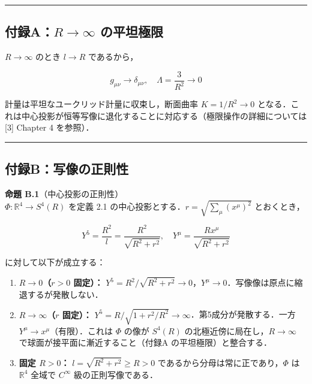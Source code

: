 \documentclass[a4paper,11pt]{ltjsarticle}
\theoremstyle{definition}
\begin{document}
\begin{center}\rule{0.5\linewidth}{0.5pt}\end{center}

\subsection{\texorpdfstring{付録A：\(R \to \infty\) の平坦極限}{付録A：R \textbackslash to \textbackslash infty の平坦極限}}\label{ux4ed8ux9332ar-to-infty-ux306eux5e73ux5766ux6975ux9650}

\(R \to \infty\) のとき \(l \to R\) であるから，

\[g_{\mu\nu} \to \delta_{\mu\nu}, \quad \Lambda = \frac{3}{R^2} \to 0\]

計量は平坦なユークリッド計量に収束し，断面曲率 \(K = 1/R^2 \to 0\) となる．これは中心投影が恒等写像に退化することに対応する（極限操作の詳細については {[}3{]} Chapter 4 を参照）．

\begin{center}\rule{0.5\linewidth}{0.5pt}\end{center}

\subsection{付録B：写像の正則性}\label{ux4ed8ux9332bux5199ux50cfux306eux6b63ux5247ux6027}

\textbf{命題 B.1}（中心投影の正則性）\\
\(\Phi: \mathbb{R}^4 \to S^4(R)\) を定義 2.1 の中心投影とする．\(r = \sqrt{\sum_\mu (x^\mu)^2}\) とおくとき，

\[Y^5 = \frac{R^2}{l} = \frac{R^2}{\sqrt{R^2 + r^2}}, \quad Y^\mu = \frac{Rx^\mu}{\sqrt{R^2+r^2}}\]

に対して以下が成立する：

\begin{enumerate}
\def\labelenumi{\arabic{enumi}.}
\item
  \textbf{\(R \to 0\)（\(r > 0\) 固定）：} \(Y^5 = R^2/\sqrt{R^2+r^2} \to 0\)，\(Y^\mu \to 0\)．写像像は原点に縮退するが発散しない．
\item
  \textbf{\(R \to \infty\)（\(r\) 固定）：} \(Y^5 = R/\sqrt{1+r^2/R^2} \to \infty\)．第5成分が発散する．一方 \(Y^\mu \to x^\mu\)（有限）．これは \(\Phi\) の像が \(S^4(R)\) の北極近傍に局在し，\(R \to \infty\) で球面が接平面に漸近すること（付録A の平坦極限）と整合する．
\item
  \textbf{固定 \(R > 0\)：} \(l = \sqrt{R^2+r^2} \geq R > 0\) であるから分母は常に正であり，\(\Phi\) は \(\mathbb{R}^4\) 全域で \(C^\infty\) 級の正則写像である．
\end{enumerate}
\end{document}
